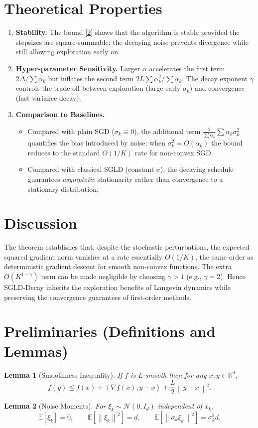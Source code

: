 \documentclass{article}
\newtheorem{lemma}{Lemma}
\newcommand{\E}{\mathbb{E}}
\newcommand{\R}{\mathbb{R}}
\newcommand{\norm}[1]{\left\|#1\right\|}
\newcommand{\ip}[2]{\left\langle #1,#2\right\rangle}
\begin{document}
\section*{Theoretical Properties}
\begin{enumerate}
\item \textbf{Stability.} The bound \eqref{2} shows that the algorithm is stable provided the stepsizes are square‑summable; the decaying noise prevents divergence while still allowing exploration early on.
\item \textbf{Hyper‑parameter Sensitivity.} Larger $\alpha$ accelerates the first term $2\Delta/\sum\alpha_k$ but inflates the second term $2L\sum\alpha_k^{2}/\sum\alpha_k$. The decay exponent $\gamma$ controls the trade‑off between exploration (large early $\sigma_k$) and convergence (fast variance decay).
\item \textbf{Comparison to Baselines.}
    \begin{itemize}
        \item Compared with plain SGD ($\sigma_k\equiv0$), the additional term $\frac{2}{\sum\alpha_k}\sum\alpha_k\sigma_k^{2}$ quantifies the bias introduced by noise; when $\sigma_k^{2}=O(\alpha_k)$ the bound reduces to the standard $O(1/K)$ rate for non‑convex SGD.
        \item Compared with classical SGLD (constant $\sigma$), the decaying schedule guarantees \emph{asymptotic} stationarity rather than convergence to a stationary distribution.
    \end{itemize}
\end{enumerate}

\section*{Discussion}
The theorem establishes that, despite the stochastic perturbations, the expected squared gradient norm vanishes at a rate essentially $O(1/K)$, the same order as deterministic gradient descent for smooth non‑convex functions. The extra $O(K^{1-\gamma})$ term can be made negligible by choosing $\gamma>1$ (e.g., $\gamma=2$). Hence SGLD‑Decay inherits the exploration benefits of Langevin dynamics while preserving the convergence guarantees of first‑order methods.

\newpage
\section*{Preliminaries (Definitions and Lemmas)}
\begin{lemma}[Smoothness Inequality]\label{lem:smooth}
If $f$ is $L$‑smooth then for any $x,y\in\R^{d}$,
\[
f(y)\le f(x)+\ip{\nabla f(x)}{y-x}+\frac{L}{2}\norm{y-x}^{2}.
\]
\end{lemma}
\begin{lemma}[Noise Moments]\label{lem:noise}
For $\xi_k\sim\mathcal N(0,I_d)$ independent of $x_k$,
\[
\E[\xi_k]=0,\qquad \E[\norm{\xi_k}^{2}]=d,\qquad 
\E[\norm{\sigma_k\xi_k}^{2}]=\sigma_k^{2}d.
\]
\end{lemma}
\end{document}
